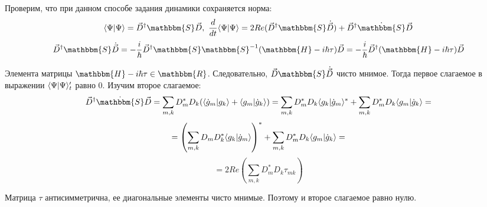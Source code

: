 Проверим, что при данном способе задания динамики сохраняется норма:
$$\myint{\Psi}{\Psi}=\vec{D}^{\dagger}\mathbbm{S}\vec{D},\ %
  \frac{d}{dt}\myint{\Psi}{\Psi}=2Re(\vec{D}^{\dagger}\mathbbm{S}\dot{\vec{D}})+\vec{D}^{\dagger}\dot{\mathbbm{S}}\vec{D}$$
$$\vec{D}^{\dagger}\mathbbm{S}\dot{\vec{D}}=%
  -\frac{i}{\hbar}\vec{D}^{\dagger}\mathbbm{S}\mathbbm{S}^{-1}(\mathbbm{H}-i\hbar\tau)\vec{D}=%
  -\frac{i}{\hbar}\vec{D}^{\dagger}(\mathbbm{H}-i\hbar\tau)\vec{D}$$

Элемента матрицы $\mathbbm{H}-i\hbar\tau\in\mathbbm{R}$. Следовательно, $\vec{D}\mathbbm{S}\dot{\vec{D}}$ чисто мнимое. 
Тогда первое слагаемое в выражении $\langle \Psi | \Psi \rangle'_t$ равно $0$.
Изучим второе слагаемое:
$$\vec{D}^{\dagger}\dot{\mathbbm{S}}\vec{D} = \sum_{m,k}D_m^*D_k(\myint{\dot{g}_m}{g_k} + \myint{g_m}{\dot{g}_k})=%
					      \sum_{m,k}D_m^*D_k\myint{g_k}{\dot{g}_m}^*+\sum_{m,k}D_m^*D_k\myint{g_m}{\dot{g}_k}=$$
$$=\left(\sum_{m,k}D_mD_k^*\langle g_k | \dot{g}_m \rangle\right)^*+\sum_{m,k}D_m^*D_k\langle g_m | \dot{g}_k \rangle=$$
$$=2\mathit{Re}\left(\sum_{m,k}D_m^*D_k\tau_{mk}\right)$$

Матрица $\tau$ антисимметрична, ее диагональные элементы чисто мнимые. Поэтому и второе слагаемое равно нулю.
